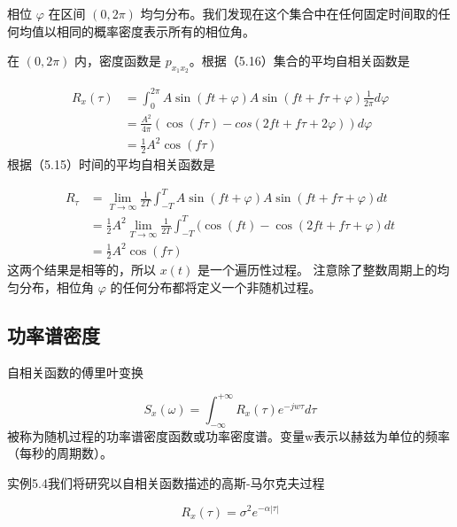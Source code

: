 	      相位 $\varphi$ 在区间  $(0,2\pi)$ 均匀分布。我们发现在这个集合中在任何固定时间取的任何均值以相同的概率密度表示所有的相位角。
	      
	      在 $(0,2\pi)$ 内，密度函数是 $ p_{x_{1}x_{2}}$。根据（5.16）集合的平均自相关函数是
	      
	       \begin{equation*}
	       \begin{aligned}
	       R_{x}(\tau)&=\int_{0}^{2\pi}A\sin(ft+\varphi) A\sin(ft+f\tau+\varphi) \frac{1}{2\pi}d\varphi\\
	       & =\frac{A^{2}}{4\pi}(\cos(f\tau)-cos(2ft+f\tau+2\varphi))d\varphi\\
	       & =\frac{1}{2}A^{2}\cos(f\tau)
	       \end{aligned}
	       \end{equation*}
	     根据（5.15）时间的平均自相关函数是
	     
	     	\begin{equation*}
	     \begin{aligned}
	     R_{\tau}&=\lim_{T\longrightarrow\infty}\frac{1}{2T}\int_{-T}^{T}A\sin(ft+\varphi)A\sin(ft+f\tau+\varphi)dt \\
	     &=\frac{1}{2}A^{2}\lim_{T\longrightarrow\infty}\frac{1}{2T}\int_{-T}^{T}(\cos(ft)-\cos(2ft+f\tau+\varphi)dt\\
	     & =\frac{1}{2}A^{2}\cos(f\tau)
	     \end{aligned}
	     \end{equation*}
	     这两个结果是相等的，所以 $x(t)$ 是一个遍历性过程。
	     注意除了整数周期上的均匀分布，相位角  $\varphi$ 的任何分布都将定义一个非随机过程。
	     
	     \subsection { 功率谱密度} 
	     
	     自相关函数的傅里叶变换
	     
	    \begin{equation}\label{5.17}
	   S_{x}(\omega)=\int_{-\infty}^{+\infty}R_{x}(\tau)e^{-jw\tau}d\tau
	   \end{equation}
	     被称为随机过程的功率谱密度函数或功率密度谱。变量w表示以赫兹为单位的频率（每秒的周期数）。
	     
	     实例5.4我们将研究以自相关函数描述的高斯-马尔克夫过程 
	     
	    \begin{equation}\label{5.18}
	    R_{x}(\tau)=\sigma^{2}e^{-\alpha|\tau|}
	    \end{equation}
	      
